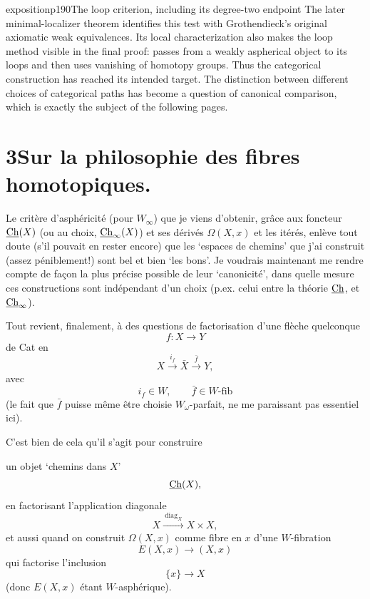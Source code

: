 \begin{dcomment}{exposition}{p190}{The loop criterion, including its degree-two endpoint}
The later minimal-localizer theorem identifies this test with Grothendieck's original axiomatic weak equivalences. Its local characterization also makes the loop method visible in the final proof: \citet[Theorem~2.3.6, especially 2.3.6.3--2.3.6.4]{Cisinski2004Minimal} passes from a weakly aspherical object to its loops and then uses vanishing of homotopy groups. Thus the categorical construction has reached its intended target. The distinction between different choices of categorical paths has become a question of canonical comparison, which is exactly the subject of the following pages.
\end{dcomment}


\section*{3\quad Sur la philosophie des fibres homotopiques.}

Le critère d'asphéricité (pour $W_\infty$) que je viens d'obtenir, grâce aux foncteur $\underline{\mathrm{Ch}}(X)$ (ou au choix, $\underline{\mathrm{Ch}}_\infty(X)$) et ses dérivés $\Omega(X,x)$ et les itérés, enlève tout doute (s'il pouvait en rester encore) que les `espaces de chemins' que j'ai construit (assez péniblement!) sont bel et bien `les bons'. Je voudrais maintenant me rendre compte de façon la plus précise possible de leur `canonicité', dans quelle mesure ces constructions sont indépendant d'un choix (p.ex. celui entre la théorie $\underline{\mathrm{Ch}}$, et $\underline{\mathrm{Ch}}_\infty$). %

Tout revient, finalement, à des questions de factorisation d'une flèche quelconque
\[
f : X \longrightarrow Y
\]
de Cat en
\[
X \xrightarrow{\ i_f\ } \bar{X} \xrightarrow{\ \bar{f}\ } Y,
\]
avec
\[
i_f \in W, \qquad \bar{f} \in W\text{-fib}
\]
(le fait que $\bar{f}$ puisse même être choisie $W_\omega$-parfait, ne me paraissant pas essentiel ici).

C'est bien de cela qu'il s'agit pour construire

un objet `chemins dans $X$'
\[
\underline{\mathrm{Ch}}(X),
\]
en factorisant l'application diagonale
\[
X \xrightarrow{\ \mathrm{diag}_X\ } X \times X,
\]
et aussi quand on construit $\Omega(X,x)$ comme fibre en $x$ d'une $W$-fibration
\[
E(X,x) \longrightarrow (X,x)
\]
qui factorise l'inclusion
\[
\{x\} \longrightarrow X
\]
(donc $E(X,x)$ étant $W$-asphérique).

